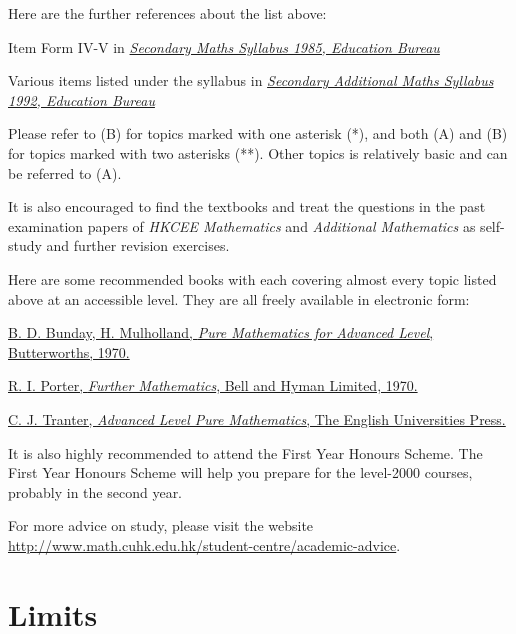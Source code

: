 \documentclass[a4paper,12pt]{article}
\begin{document}
Here are the further references about the list above:
\begin{Alist}
  \item Item Form IV-V in \href{https://www.edb.gov.hk/en/curriculum-development/kla/ma/curr/sec-math-1985.html}{\textit{Secondary Maths Syllabus 1985, Education Bureau}}
  \item Various items listed under the syllabus in \href{http://www.edb.gov.hk/en/curriculum-development/kla/ma/curr/add-math-1992.html}{\textit{Secondary Additional Maths Syllabus 1992, Education Bureau}}
\end{Alist}

Please refer to (B) for topics marked with one asterisk (*), and both (A) and (B) for topics marked with two asterisks (**). Other topics is relatively basic and can be referred to (A).\n

It is also encouraged to find the textbooks and treat the questions in the past examination papers of \textit{HKCEE Mathematics} and \textit{Additional Mathematics} as self-study and further revision exercises.\n

Here are some recommended books with each covering almost every topic listed above at an accessible level. They are all freely available in electronic form:
\begin{rlist}
  \item \href{https://archive.org/details/PureMathematicsForAdvancedLevel}{B. D. Bunday, H. Mulholland, \textit{Pure Mathematics for Advanced Level}, Butterworths, 1970.}
  \item \href{https://archive.org/details/FurtherMathematics}{R. I. Porter, \textit{Further Mathematics}, Bell and Hyman Limited, 1970.}
  \item \href{https://archive.org/details/in.ernet.dli.2015.285850}{C. J. Tranter, \textit{Advanced Level Pure Mathematics}, The English Universities Press.}
\end{rlist}

It is also highly recommended to attend the First Year Honours Scheme. The First Year Honours Scheme will help you prepare for the level-2000 courses, probably in the second year.\n

For more advice on study, please visit the website \url{http://www.math.cuhk.edu.hk/student-centre/academic-advice}.

\pagebreak

\fancyhead[R]{\nouppercase \lastrightmark}
\section{Limits}
\end{document}
